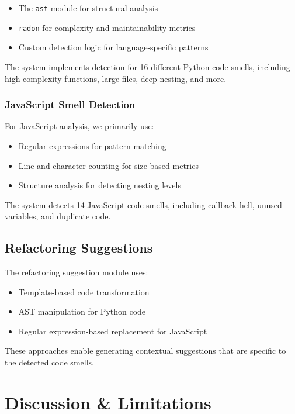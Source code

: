 \documentclass[sigconf,screen]{acmart}
\begin{document}
\begin{itemize}
    \item The \texttt{ast} module for structural analysis
    \item \texttt{radon} for complexity and maintainability metrics
    \item Custom detection logic for language-specific patterns
\end{itemize}

The system implements detection for 16 different Python code smells, including high complexity functions, large files, deep nesting, and more.

\subsubsection{JavaScript Smell Detection}

For JavaScript analysis, we primarily use:

\begin{itemize}
    \item Regular expressions for pattern matching
    \item Line and character counting for size-based metrics
    \item Structure analysis for detecting nesting levels
\end{itemize}

The system detects 14 JavaScript code smells, including callback hell, unused variables, and duplicate code.

\subsection{Refactoring Suggestions}

The refactoring suggestion module uses:

\begin{itemize}
    \item Template-based code transformation
    \item AST manipulation for Python code
    \item Regular expression-based replacement for JavaScript
\end{itemize}

These approaches enable generating contextual suggestions that are specific to the detected code smells.

\section{Discussion \& Limitations}
\end{document}
